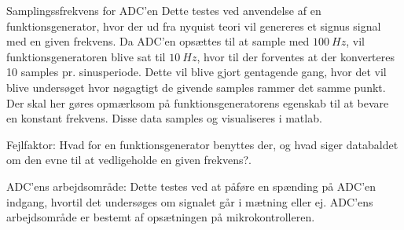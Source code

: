Samplingssfrekvens for ADC'en 
Dette testes ved anvendelse af en funktionsgenerator, hvor der ud fra nyquist teori vil genereres et signus signal med en given frekvens. 
Da ADC'en opsættes til at sample med $100~Hz$, vil funktionsgeneratoren blive sat til $10~Hz$, hvor til der forventes at der konverteres 10 samples pr. sinusperiode. Dette vil blive gjort gentagende gang, hvor det vil blive undersøget hvor nøgagtigt de givende samples rammer det samme punkt. Der skal her gøres opmærksom på funktionsgeneratorens egenskab til at bevare en konstant frekvens. Disse data samples og visualiseres i matlab.  

Fejlfaktor:
Hvad for en funktionsgenerator benyttes der, og hvad siger databaldet om den evne til at vedligeholde en given frekvens?. 

ADC'ens arbejdsområde:
Dette testes ved at påføre en spænding på ADC'en indgang, hvortil det undersøges om signalet går i mætning eller ej. ADC'ens arbejdsområde er bestemt af opsætningen på mikrokontrolleren.  